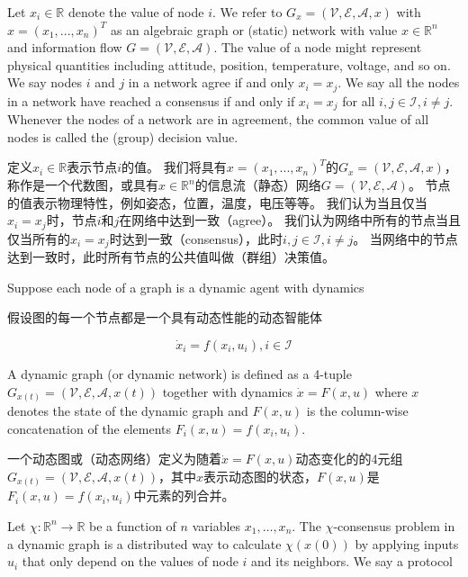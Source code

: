 \documentclass{article}
\begin{document}
{\color[gray]{0.5}
Let $x_i\in \mathbb{R}$ denote the value of node $i$. 
We refer to $G_x=(\mathcal{V},\mathcal{E},\mathcal{A},x)$ with $x=(x_1,...,x_n)^T$ as an algebraic graph or (static) network with value $x\in \mathbb{R}^n$ and information ﬂow $G=(\mathcal{V},\mathcal{E},\mathcal{A})$. 
The value of a node might represent physical quantities including attitude, position, temperature, voltage, and so on. 
We say nodes $i$ and $j$ in a network agree if and only $x_i=x_j$. 
We say all the nodes in a network have reached a consensus if and only if $x_i=x_j$ for all $i,j\in \mathcal{I}, i\ne j$. 
Whenever the nodes of a network are in agreement, the common value of all nodes is called the (group) decision value.
}

定义$x_i\in \mathbb{R}$表示节点$i$的值。
我们将具有$x=(x_1,...,x_n)^T$的$G_x=(\mathcal{V},\mathcal{E},\mathcal{A},x)$，称作是一个代数图，或具有$x\in \mathbb{R}^n$的信息流（静态）网络$G=(\mathcal{V},\mathcal{E},\mathcal{A})$。
节点的值表示物理特性，例如姿态，位置，温度，电压等等。
我们认为当且仅当$x_i=x_j$时，节点$i$和$j$在网络中达到一致（agree）。
我们认为网络中所有的节点当且仅当所有的$x_i=x_j$时达到一致（consensus），此时$i,j\in \mathcal{I}, i\ne j$。
当网络中的节点达到一致时，此时所有节点的公共值叫做（群组）决策值。

{\color[gray]{0.5}
Suppose each node of a graph is a dynamic agent with dynamics
}

假设图的每一个节点都是一个具有动态性能的动态智能体

\begin{equation}
    \dot{x}_i = f(x_i, u_i), i\in \mathcal{I}
    \tag{2}
    \label{2}
\end{equation}

{\color[gray]{0.5}
\noindent A dynamic graph (or dynamic network) is deﬁned as a 4-tuple $G_{x(t)} = (\mathcal{V},\mathcal{E},\mathcal{A},x(t))$ together with dynamics $\dot{x}=F(x,u)$ where $x$ denotes the state of the dynamic graph and $F(x,u)$ is the column-wise concatenation of the elements $F_i(x,u)=f(x_i,u_i)$.
}

\noindent 一个动态图或（动态网络）定义为随着$\dot{x}=F(x,u)$动态变化的的4元组$G_{x(t)} = (\mathcal{V},\mathcal{E},\mathcal{A},x(t))$，其中$x$表示动态图的状态，$F(x,u)$是$F_i(x,u)=f(x_i,u_i)$中元素的列合并。

{\color[gray]{0.5}
Let $\chi: \mathbb{R}^n \rightarrow \mathbb{R}$ be a function of $n$ variables $x_1,\dots,x_n$. 
The $\chi$-consensus problem in a dynamic graph is a distributed way to calculate $\chi(x(0))$ by applying inputs $u_i$ that only depend on the values of node $i$ and its neighbors. 
We say a protocol
}
\end{document}
